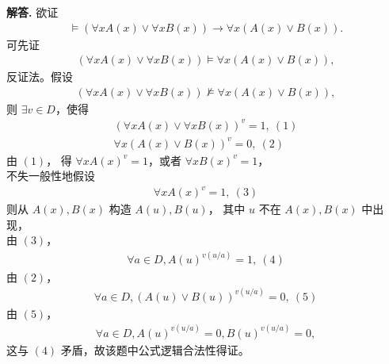 \documentclass[12pt, a4paper, oneside]{ctexart}
\newenvironment{solution}{\par\noindent\textbf{解答. }}{\par}
\begin{document}
\begin{solution}
    欲证
    \begin{align*}
        \models
        (\forall x A(x)\lor \forall xB(x))
        \rightarrow
        \forall x(A(x)\lor B(x)).
    \end{align*}
    可先证
    \begin{align*}
        (\forall x A(x)\lor \forall xB(x))
        \models
        \forall x(A(x)\lor B(x)),
    \end{align*}
    反证法。假设 
    \begin{align*}
        (\forall x A(x)\lor \forall xB(x))
        \not\models
        \forall x(A(x)\lor B(x)),
    \end{align*}
    则 $\exists v\in D$，使得
    \begin{align*}
        (\forall x A(x)\lor \forall xB(x))^v=1,\ (1)\\
        \forall x(A(x)\lor B(x))^v=0,\ (2)
    \end{align*}
    由 $(1)$，
    得 $\forall xA(x)^v=1$，或者 
    $\forall xB(x)^v=1$，\\
    不失一般性地假设
    \begin{align*}
        \forall x A(x)^v=1, \ (3)
    \end{align*}
    则从 $A(x), B(x)$ 构造 $A(u), B(u)$，
    其中 $u$ 不在 $A(x), B(x)$ 中出现，\\
    由 $(3)$，
    \begin{align*}
        \forall a\in D, A(u)^{v(u/a)}=1,\ (4)
    \end{align*}
    由 $(2)$，
    \begin{align*}
        \forall a\in D, (A(u)\lor B(u))^{v(u/a)}=0,\ (5)
    \end{align*}
    由 $(5)$，
    \begin{align*}
        \forall a\in D, A(u)^{v(u/a)}=0, B(u)^{v(u/a)}=0,
    \end{align*}
    这与 $(4)$ 矛盾，故该题中公式逻辑合法性得证。
\end{solution}

\newpage
\end{document}
